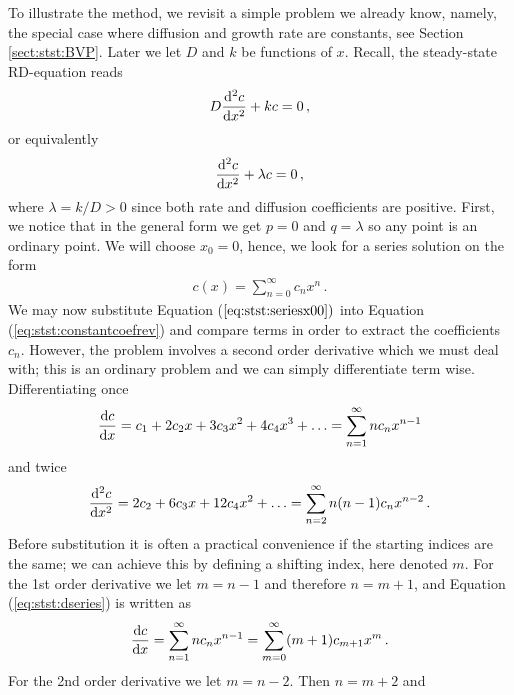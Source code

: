 \begin{example}
	To illustrate the method, we revisit a simple problem we already know, namely, the special case 
	where diffusion and growth rate are constants, see Section \ref{sect:stst:BVP}. 
	Later we let $D$ and $k$ be functions of $x$. Recall, the steady-state RD-equation reads
	\begin{eqnarray}
		\label{eq:stst:constantcoefrev}
		D\frac{\mathrm{d}^2 c}{\mathrm{d} x^2} + k c = 0  \, ,
	\end{eqnarray}
	or equivalently 
	\begin{equation}
		\label{eq:stst:lambdaform}
		\frac{\mathrm{d}^2c}{\mathrm{d} x^2}  + \lambda c = 0 \, ,
	\end{equation}
	where $\lambda = k/D > 0$ since both rate and diffusion coefficients are positive. 
	First, we notice that in the general form we get $p=0$ and $q=\lambda$ so any point 
	is an ordinary point. We will choose $x_0=0$, hence, we look for a series solution on the form
	\begin{eqnarray}
		\label{eq:stst:seriesx00}
		c(x) = \sum_{n=0}^\infty c_n x^n \, .
	\end{eqnarray}
	We may now substitute Equation ($\ref{eq:stst:seriesx00})$ into Equation (\ref{eq:stst:constantcoefrev})
	and compare terms in order to extract the coefficients $c_n$. However, 
	the problem involves a second order derivative which we must deal with; this is an ordinary problem and 
	we can simply differentiate term wise. Differentiating once  
	\begin{eqnarray}
		\label{eq:stst:dseries}
		\frac{\mathrm{d} c}{\mathrm{d} x} = c_1 + 2c_2x + 3c_3x^2 + 4c_4 x^3 + \ldots = \sum_{n=1}^\infty n c_n x^{n-1}
	\end{eqnarray}
	and twice 
	\begin{eqnarray}
		\label{eq:stst:d2series}
		\frac{\mathrm{d}^2c}{\mathrm{d} x^2} = 2c_2 + 6c_3x + 12c_4x^2 + \ldots = \sum_{n=2}^\infty n(n-1) c_n
		x^{n-2} \, .
	\end{eqnarray}
	Before substitution it is often a practical convenience if the starting indices are the same; we can
	achieve this by defining a shifting index, here denoted $m$. For the 1st order derivative 
	we let  $m=n-1$ and therefore $n=m+1$, and Equation (\ref{eq:stst:dseries}) is written as
	\begin{eqnarray}
		\label{eq:stst:dindexshift}
		\frac{\mathrm{d} c}{\mathrm{d} x} = \sum_{n=1}^\infty n c_n x^{n-1}=\sum_{m=0}^\infty (m+1) c_{m+1}x^m \, .
	\end{eqnarray}
	For the 2nd order derivative we let $m=n-2$. Then $n=m+2$ and 

\end{example}
